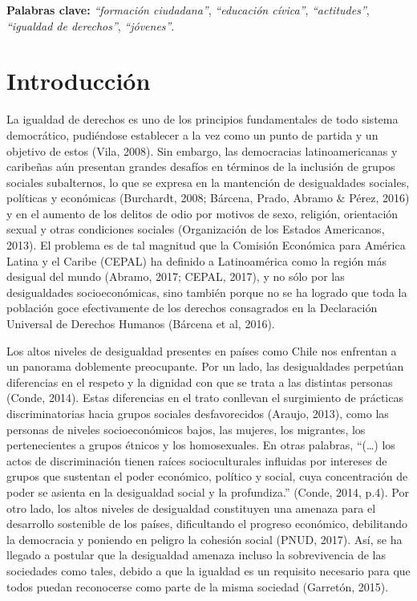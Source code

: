 \documentclass[12pt,twoside]{templates/facsothesis}
\begin{document}
\textbf{Palabras clave:} \emph{``formación ciudadana''}, \emph{``educación cívica''}, \emph{``actitudes''}, \emph{``igualdad de derechos''}, \emph{``jóvenes''}.

\hypertarget{introducciuxf3n}{%
\chapter{Introducción}\label{introducciuxf3n}}

La igualdad de derechos es uno de los principios fundamentales de todo sistema democrático, pudiéndose establecer a la vez como un punto de partida y un objetivo de estos (Vila, 2008). Sin embargo, las democracias latinoamericanas y caribeñas aún presentan grandes desafíos en términos de la inclusión de grupos sociales subalternos, lo que se expresa en la mantención de desigualdades sociales, políticas y económicas (Burchardt, 2008; Bárcena, Prado, Abramo \& Pérez, 2016) y en el aumento de los delitos de odio por motivos de sexo, religión, orientación sexual y otras condiciones sociales (Organización de los Estados Americanos, 2013). El problema es de tal magnitud que la Comisión Económica para América Latina y el Caribe (CEPAL) ha definido a Latinoamérica como la región más desigual del mundo (Abramo, 2017; CEPAL, 2017), y no sólo por las desigualdades socioeconómicas, sino también porque no se ha logrado que toda la población goce efectivamente de los derechos consagrados en la Declaración Universal de Derechos Humanos (Bárcena et al, 2016).

Los altos niveles de desigualdad presentes en países como Chile nos enfrentan a un panorama doblemente preocupante. Por un lado, las desigualdades perpetúan diferencias en el respeto y la dignidad con que se trata a las distintas personas (Conde, 2014). Estas diferencias en el trato conllevan el surgimiento de prácticas discriminatorias hacia grupos sociales desfavorecidos (Araujo, 2013), como las personas de niveles socioeconómicos bajos, las mujeres, los migrantes, los pertenecientes a grupos étnicos y los homosexuales. En otras palabras, ``(\ldots) los actos de discriminación tienen raíces socioculturales influidas por intereses de grupos que sustentan el poder económico, político y social, cuya concentración de poder se asienta en la desigualdad social y la profundiza.'' (Conde, 2014, p.4). Por otro lado, los altos niveles de desigualdad constituyen una amenaza para el desarrollo sostenible de los países, dificultando el progreso económico, debilitando la democracia y poniendo en peligro la cohesión social (PNUD, 2017). Así, se ha llegado a postular que la desigualdad amenaza incluso la sobrevivencia de las sociedades como tales, debido a que la igualdad es un requisito necesario para que todos puedan reconocerse como parte de la misma sociedad (Garretón, 2015).
\end{document}
